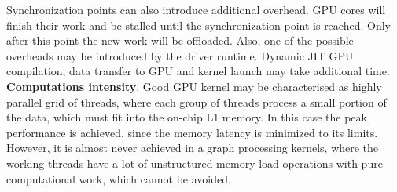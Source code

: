 Synchronization points can also introduce additional overhead. GPU cores will finish their work and be stalled until the synchronization point is reached. Only after this point the new work will be offloaded. Also, one of the possible overheads may be introduced by the driver runtime. Dynamic JIT GPU compilation, data transfer to GPU and kernel launch may take additional time.\\

\textbf{Computations intensity}. Good GPU kernel may be characterised as highly parallel grid of threads, where each group of threads process a small portion of the data, which must fit into the on-chip L1 memory. In this case the peak performance is achieved, since the memory latency is minimized to its limits. However, it is almost never achieved in a graph processing kernels, where the working threads have a lot of unstructured memory load operations with pure computational work, which cannot be avoided.\\
